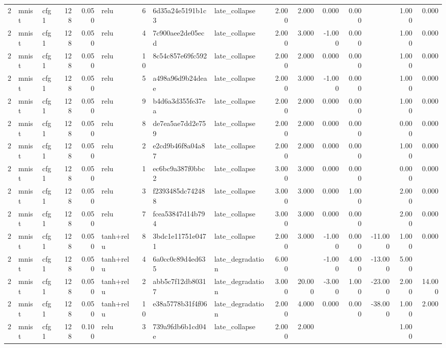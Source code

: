 \begin{table}[htbp]
{\begin{tabular}{@{}rllrrlrllrrrrrrr@{}}
2 & mnist & cfg1 & 128 & 0.050 & relu & 6 & 6d35a24e5191b1c3 & late\_collapse & 2.000 & 2.000 & 0.000 & 0.000 &  & 1.000 & 0.000 \\
2 & mnist & cfg1 & 128 & 0.050 & relu & 4 & 7c900aee2de05ecd & late\_collapse & 2.000 & 3.000 & -1.000 & 0.000 &  & 1.000 & 0.000 \\
2 & mnist & cfg1 & 128 & 0.050 & relu & 10 & 8c54c857e69fc592 & late\_collapse & 2.000 & 2.000 & 0.000 & 0.000 &  & 1.000 & 0.000 \\
2 & mnist & cfg1 & 128 & 0.050 & relu & 5 & a498a96d9b24deae & late\_collapse & 2.000 & 3.000 & -1.000 & 0.000 &  & 1.000 & 0.000 \\
2 & mnist & cfg1 & 128 & 0.050 & relu & 9 & b4d6a3d355fe37ea & late\_collapse & 2.000 & 2.000 & 0.000 & 0.000 &  & 1.000 & 0.000 \\
2 & mnist & cfg1 & 128 & 0.050 & relu & 8 & de7ea5ae7dd2e759 & late\_collapse & 2.000 & 2.000 & 0.000 & 0.000 &  & 0.000 & 0.000 \\
2 & mnist & cfg1 & 128 & 0.050 & relu & 2 & e2cd9b46f8a04a87 & late\_collapse & 2.000 & 2.000 & 0.000 & 0.000 &  & 1.000 & 0.000 \\
2 & mnist & cfg1 & 128 & 0.050 & relu & 1 & ec6bc9a387f0bbc2 & late\_collapse & 3.000 & 3.000 & 0.000 & 0.000 &  & 0.000 & 0.000 \\
2 & mnist & cfg1 & 128 & 0.050 & relu & 3 & f2393485dc742488 & late\_collapse & 3.000 & 3.000 & 0.000 & 1.000 &  & 2.000 & 0.000 \\
2 & mnist & cfg1 & 128 & 0.050 & relu & 7 & fcea53847d14b794 & late\_collapse & 3.000 & 3.000 & 0.000 & 0.000 &  & 2.000 & 0.000 \\
2 & mnist & cfg1 & 128 & 0.050 & tanh+relu & 8 & 3bdc1e11751e0471 & late\_collapse & 2.000 & 3.000 & -1.000 & 0.000 & -11.000 & 1.000 & 0.000 \\
2 & mnist & cfg1 & 128 & 0.050 & tanh+relu & 4 & 6a0cc0c89d4ed635 & late\_degradation & 6.000 &  & -1.000 & 4.000 & -13.000 & 5.000 &  \\
2 & mnist & cfg1 & 128 & 0.050 & tanh+relu & 2 & abb5c7f12db80317 & late\_degradation & 3.000 & 20.000 & -3.000 & 1.000 & -23.000 & 2.000 & 14.000 \\
2 & mnist & cfg1 & 128 & 0.050 & tanh+relu & 10 & e38a5778b31f4f06 & late\_degradation & 2.000 & 4.000 & 0.000 & 0.000 & -38.000 & 1.000 & 2.000 \\
2 & mnist & cfg1 & 128 & 0.100 & relu & 3 & 739a9fdb6b1cd04e & late\_collapse & 2.000 & 2.000 &  &  &  & 1.000 &  \\

\end{tabular}}
\end{table}
